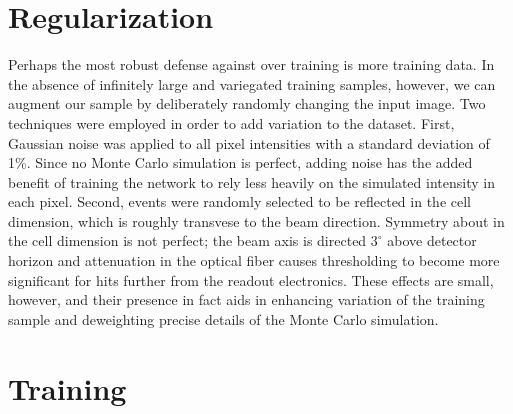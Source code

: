 \clearpage

\section{Regularization}

Perhaps the most robust defense against over training is more training
data.
In the absence of infinitely large and variegated training samples, however,
we can augment our sample by deliberately randomly changing the input image.
Two techniques were employed in order to add variation to the dataset.
First, Gaussian noise was applied to all pixel intensities with
a standard deviation of 1\%.
Since no Monte Carlo simulation is perfect, adding noise has the added benefit
of training the network to rely less heavily on the simulated intensity
in each pixel.
Second, events were randomly selected to be reflected in the cell dimension,
which is roughly transvese to the beam direction.
Symmetry about in the cell dimension is not perfect; the beam axis is directed
$3^{\circ}$ above detector horizon and attenuation in the optical fiber
causes thresholding to become more significant for hits further from
the readout electronics.
These effects are small, however, and their presence in fact aids in
enhancing variation of the training sample and deweighting precise details
of the Monte Carlo simulation.


\section{Training}




